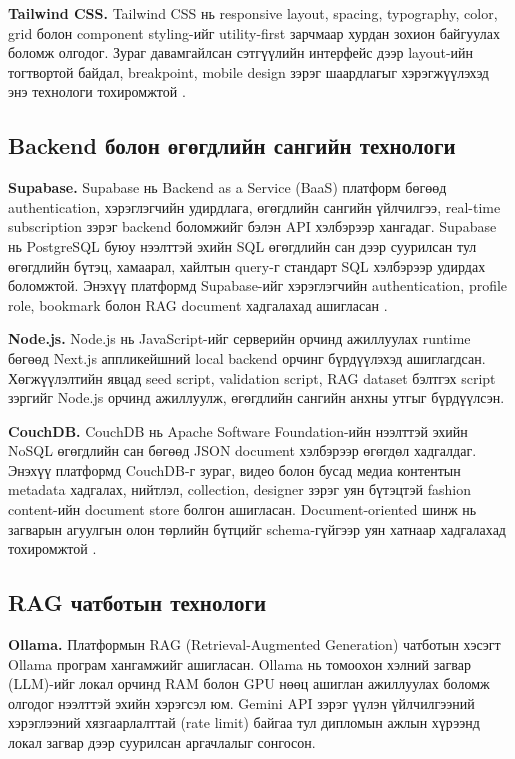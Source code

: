 \textbf{Tailwind CSS.} Tailwind CSS нь responsive layout, spacing, typography, color, grid болон component styling-ийг utility-first зарчмаар хурдан зохион байгуулах боломж олгодог. Зураг давамгайлсан сэтгүүлийн интерфейс дээр layout-ийн тогтвортой байдал, breakpoint, mobile design зэрэг шаардлагыг хэрэгжүүлэхэд энэ технологи тохиромжтой \cite{tailwind_docs}.

\subsection*{Backend болон өгөгдлийн сангийн технологи}

\textbf{Supabase.} Supabase нь Backend as a Service (BaaS) платформ бөгөөд authentication, хэрэглэгчийн удирдлага, өгөгдлийн сангийн үйлчилгээ, real-time subscription зэрэг backend боломжийг бэлэн API хэлбэрээр хангадаг. Supabase нь PostgreSQL буюу нээлттэй эхийн SQL өгөгдлийн сан дээр суурилсан тул өгөгдлийн бүтэц, хамаарал, хайлтын query-г стандарт SQL хэлбэрээр удирдах боломжтой. Энэхүү платформд Supabase-ийг хэрэглэгчийн authentication, profile role, bookmark болон RAG document хадгалахад ашигласан \cite{supabase_docs}.

\textbf{Node.js.} Node.js нь JavaScript-ийг серверийн орчинд ажиллуулах runtime бөгөөд Next.js аппликейшний local backend орчинг бүрдүүлэхэд ашиглагдсан. Хөгжүүлэлтийн явцад seed script, validation script, RAG dataset бэлтгэх script зэргийг Node.js орчинд ажиллуулж, өгөгдлийн сангийн анхны утгыг бүрдүүлсэн.

\textbf{CouchDB.} CouchDB нь Apache Software Foundation-ийн нээлттэй эхийн NoSQL өгөгдлийн сан бөгөөд JSON document хэлбэрээр өгөгдөл хадгалдаг. Энэхүү платформд CouchDB-г зураг, видео болон бусад медиа контентын metadata хадгалах, нийтлэл, collection, designer зэрэг уян бүтэцтэй fashion content-ийн document store болгон ашигласан. Document-oriented шинж нь загварын агуулгын олон төрлийн бүтцийг schema-гүйгээр уян хатнаар хадгалахад тохиромжтой \cite{couchdb_docs}.

\subsection*{RAG чатботын технологи}

\textbf{Ollama.} Платформын RAG (Retrieval-Augmented Generation) чатботын хэсэгт Ollama програм хангамжийг ашигласан. Ollama нь томоохон хэлний загвар (LLM)-ийг локал орчинд RAM болон GPU нөөц ашиглан ажиллуулах боломж олгодог нээлттэй эхийн хэрэгсэл юм. Gemini API зэрэг үүлэн үйлчилгээний хэрэглээний хязгаарлалттай (rate limit) байгаа тул дипломын ажлын хүрээнд локал загвар дээр суурилсан аргачлалыг сонгосон.

